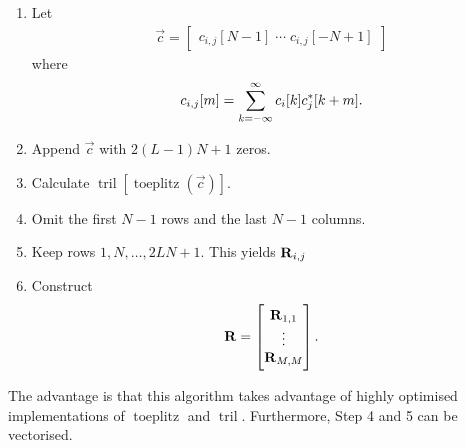 \documentclass[a4paper, openany, oneside]{memoir}
\begin{document}
\begin{enumerate}[labelindent=0pt,labelwidth=\widthof{\ref{last-item2}},label=Step \arabic*:,itemindent=1em,leftmargin=!]
    \item Let \begin{align*}
                \vec{c} = \begin{bmatrix} c_{i,j}[N-1] \; \cdots \; c_{i,j}[-N+1] \end{bmatrix}
\end{align*} where \begin{align*}
                c_{i,j}[m] = \sum_{k=-\infty}^{\infty}c_i[k] c^*_j[k+m].
            \end{align*}
    \item Append $\vec{c}$ with $2(L-1)N+1$ zeros. \\
    \item Calculate $\operatorname{tril}[\operatorname{toeplitz}(\vec{c})]$. \\
    \item Omit the first $N-1$ rows and the last $N-1$ columns. \\
    \item Keep rows $1,N,\ldots,2LN+1$. This yields $\boldsymbol{\mathbf{R}}_{i,j}$ \\
    \item Construct \begin{align*}
        \boldsymbol{\mathbf{R}} = \begin{bmatrix}
            \boldsymbol{\mathbf{R}}_{1,1} \\ \vdots \\ \boldsymbol{\mathbf{R}}_{M,M}
        \end{bmatrix}.
    \end{align*}
    \label{last-item2}
\end{enumerate}

The advantage is that this algorithm takes advantage of highly optimised implementations of $\operatorname{toeplitz}$ and $\operatorname{tril}$. Furthermore, Step 4 and 5 can be vectorised.
\end{document}
